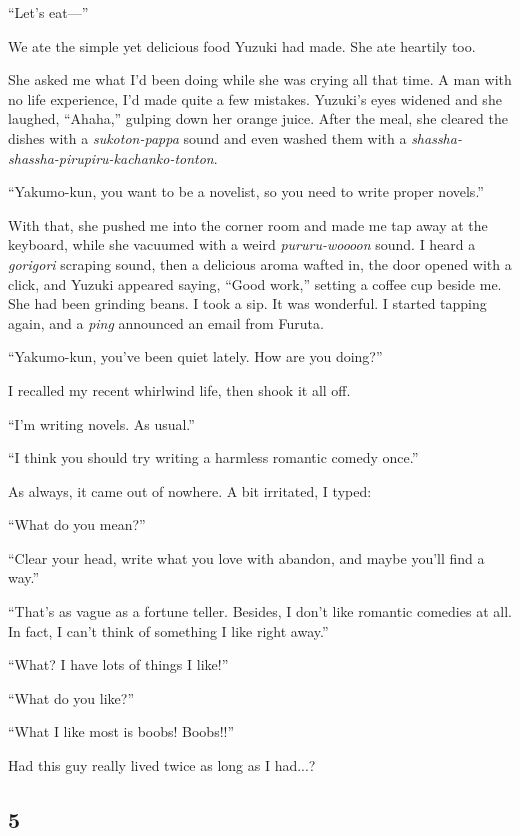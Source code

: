 \documentclass[
    a4paper,
    12pt,
    twoside,
    openany,
    UTF8,
    fontset=windows
]{ctexbook}
\begin{document}
``Let's eat---''

We ate the simple yet delicious food Yuzuki had made. She ate heartily too.

She asked me what I'd been doing while she was crying all that time. A man with no life experience, I'd made quite a few mistakes. Yuzuki's eyes widened and she laughed, ``Ahaha,'' gulping down her orange juice. After the meal, she cleared the dishes with a \textit{sukoton-pappa} sound and even washed them with a \textit{shassha-shassha-pirupiru-kachanko-tonton}.

``Yakumo-kun, you want to be a novelist, so you need to write proper novels.''

With that, she pushed me into the corner room and made me tap away at the keyboard, while she vacuumed with a weird \textit{pururu-woooon} sound. I heard a \textit{gorigori} scraping sound, then a delicious aroma wafted in, the door opened with a click, and Yuzuki appeared saying, ``Good work,'' setting a coffee cup beside me. She had been grinding beans. I took a sip. It was wonderful. I started tapping again, and a \textit{ping} announced an email from Furuta.

``Yakumo-kun, you've been quiet lately. How are you doing?''

I recalled my recent whirlwind life, then shook it all off.

``I'm writing novels. As usual.''

``I think you should try writing a harmless romantic comedy once.''

As always, it came out of nowhere. A bit irritated, I typed:

``What do you mean?''

``Clear your head, write what you love with abandon, and maybe you'll find a way.''

``That's as vague as a fortune teller. Besides, I don't like romantic comedies at all. In fact, I can't think of something I like right away.''

``What? I have lots of things I like!''

``What do you like?''

``What I like most is boobs! Boobs!!''

Had this guy really lived twice as long as I had...?


\subsection*{5}
\end{document}
